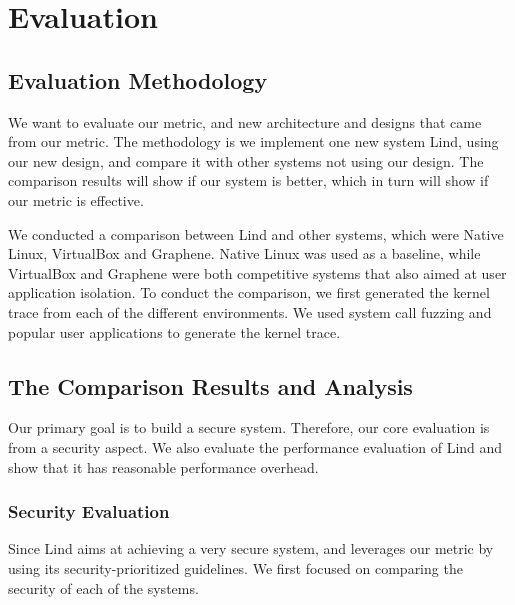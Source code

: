 \section{Evaluation}
\label{sec.evaluation}

\subsection{Evaluation Methodology}
We want to evaluate our metric, and new architecture and designs that came from our metric. 
The methodology is we implement one new system Lind, using our new design, and compare it 
with other systems not using our design. The comparison results will show if our system is better, 
which in turn will show if our metric is effective. 

We conducted a comparison between Lind and other systems, which were Native Linux, 
VirtualBox and Graphene. Native Linux was used as a baseline, while VirtualBox and Graphene
were both competitive systems that also aimed at user application isolation.
%
To conduct the comparison, we first generated the kernel trace from each of the different 
environments. We used system call fuzzing and popular user applications to generate the kernel trace. 

\subsection{The Comparison Results and Analysis}
Our primary goal is to build a secure system. Therefore, our core evaluation is from a security aspect. 
We also evaluate the performance evaluation of Lind and show that it has reasonable performance overhead. 

\subsubsection{Security Evaluation}
Since Lind aims at achieving a very secure system, and leverages our metric by using its 
security-prioritized guidelines. We first focused on comparing the security of each of the systems.

